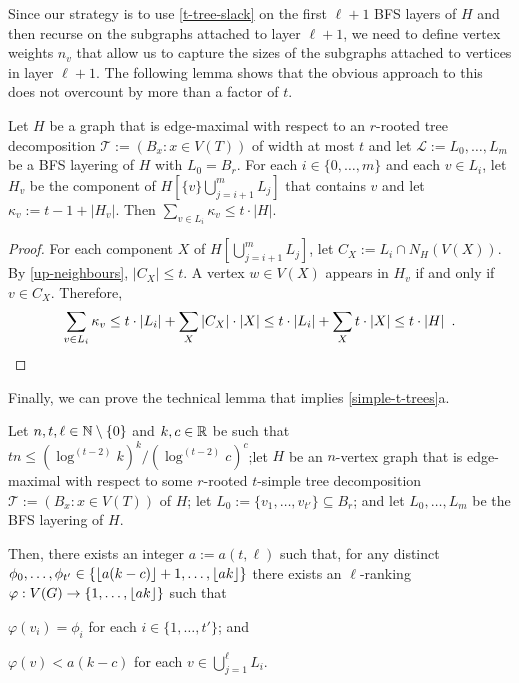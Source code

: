 \documentclass[kpfonts]{patmorin}
\theoremstyle{named}
\newcommand{\weirdref}[2]{\cref{#1}#2}
\begin{document}
Since our strategy is to use \cref{t-tree-slack} on the first $\ell+1$ BFS layers of $H$ and then recurse on the subgraphs attached to layer $\ell+1$, we need to define vertex weights $n_v$ that allow us to capture the sizes of the subgraphs attached to vertices in layer $\ell+1$.  The following lemma shows that the obvious approach to this does not overcount by more than a factor of $t$.

\begin{lem}\label{size-claim}
    Let $H$ be a graph that is edge-maximal with respect to an $r$-rooted tree decomposition $\mathcal{T}:=(B_x:x\in V(T))$ of width at most $t$ and let $\mathcal{L}:=L_0,\ldots,L_m$ be a BFS layering of $H$ with $L_0=B_r$.  For each $i\in\{0,\ldots,m\}$ and each $v\in L_i$, let $H_v$ be the component of $H[\{v\}\bigcup_{j=i+1}^m L_j]$ that contains $v$ and let $\kappa_v:= t-1+|H_v|$.  Then $\sum_{v\in L_i} \kappa_v \le t\cdot|H|$.
\end{lem}

\begin{proof}
    For each component $X$ of $H[\bigcup_{j=i+1}^m L_j]$, let $C_X:=L_i\cap N_H(V(X))$.  By \cref{up-neighbours}, $|C_X|\le t$. A vertex $w\in V(X)$ appears in $H_v$ if and only if $v\in C_X$.  Therefore,
    \[
        \sum_{v\in L_i} \kappa_v \le t\cdot|L_i| + \sum_{X}|C_X|\cdot|X| \le t\cdot|L_i| + \sum_{X}t\cdot|X|\le t\cdot|H| \enspace .  \qedhere
    \]
\end{proof}

Finally, we can prove the technical lemma that implies \weirdref{simple-t-trees}{a}.

\begin{lem}\label{t-tree-technical}
    Let $n,t,\ell\in\mathbb{N}\setminus\{0\}$ and $k, c\in\mathbb{R}$ be such that $tn\le (\log^{(t-2)} k)^k/(\log^{(t-2)} c)^{c}$;let $H$ be an $n$-vertex graph that is edge-maximal with respect to some $r$-rooted $t$-simple tree decomposition $\mathcal{T}:=(B_x:x\in V(T))$ of $H$; let $L_0:=\{v_1,\ldots,v_{t'}\}\subseteq B_r$; and let $L_0,\ldots,L_m$ be the BFS layering of $H$.

    Then, there exists an integer $a:=a(t,\ell)$ such that, for any distinct $\phi_0,\ldots,\phi_{t'}\in \{{\lfloor a(k-c) \rfloor}+1,\ldots,{\lfloor ak \rfloor}\}$ there exists an $\ell$-ranking $\varphi:V(G)\to\{1,\ldots,{\lfloor ak \rfloor}\}$ such that
    \begin{compactenum}[(R1)]
        \item $\varphi(v_i)=\phi_i$ for each $i\in\{1,\ldots,t'\}$; and
        \item $\varphi(v)<a(k-c)$ for each $v\in\bigcup_{j=1}^{\ell} L_i$.
    \end{compactenum}
\end{lem}
\end{document}

